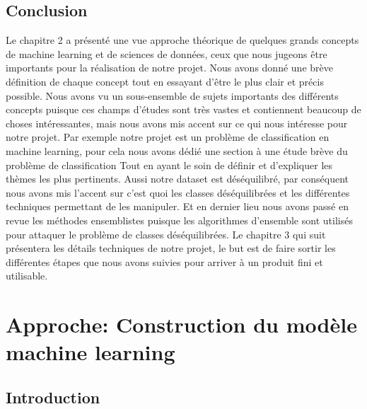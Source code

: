 \documentclass[12pt, french]{report}
\begin{document}
\section{Conclusion}
Le chapitre 2 a présenté une vue approche théorique de quelques grands concepts de machine learning et de sciences de données, ceux que nous jugeons être importants pour la réalisation de notre projet. Nous avons donné une brève définition de chaque concept tout en essayant d'être le plus clair et précis possible. Nous avons vu un sous-ensemble de sujets importants des différents concepts puisque ces champs d'études sont très vastes et contiennent beaucoup de choses intéressantes, mais nous avons mis accent sur ce qui nous intéresse pour notre projet. Par exemple notre projet est un problème de classification en machine learning, pour cela nous avons dédié une section à une étude brève du problème de classification Tout en ayant le soin de définir et d'expliquer les thèmes les plus pertinents. Aussi notre dataset est déséquilibré, par conséquent nous avons mis l'accent sur c'est quoi les classes déséquilibrées et les différentes techniques permettant de les manipuler. Et en dernier lieu nous avons passé en revue les méthodes ensemblistes puisque les algorithmes d'ensemble sont utilisés pour attaquer le problème de classes déséquilibrées. Le chapitre 3 qui suit présentera les détails techniques de notre projet, le but est de faire sortir les différentes étapes que nous avons suivies pour arriver à un produit fini et utilisable.

 




%
%
%
%
%



\newpage

\chapter{Approche: Construction du modèle machine learning} \label{chap:modelml}
\section{Introduction}
\end{document}
